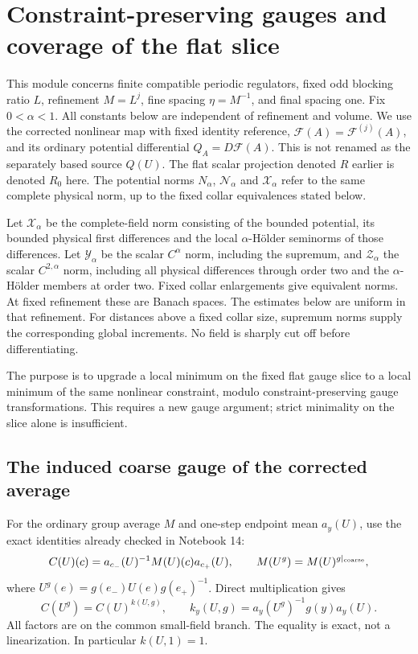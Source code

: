 \documentclass[11pt]{article}
\theoremstyle{remark}
\newcommand{\norm}[1]{\left\|#1\right\|}
\begin{document}
\section{Constraint-preserving gauges and coverage of the flat slice}
\label{ng-section}

This module concerns finite compatible periodic regulators, fixed
odd blocking ratio $L$, refinement $M=L^j$, fine spacing $\eta=M^{-1}$,
and final spacing one. Fix $0<\alpha<1$. All constants below are
independent of refinement and volume. We use the corrected nonlinear
map with fixed identity reference, $\mathcal F(A)=\mathcal F^{(j)}(A)$,
and its ordinary potential differential $Q_A=D\mathcal F(A)$.
This is not renamed as the separately based source $Q(U)$.
The flat scalar projection denoted $R$ earlier is denoted $R_0$
here. The potential norms $N_\alpha$, $\mathcal N_\alpha$ and
$\mathcal X_\alpha$ refer to the same complete physical norm,
up to the fixed collar equivalences stated below.

Let $\mathcal X_\alpha$ be the complete-field norm consisting of
the bounded potential, its bounded physical first differences and
the local $\alpha$-H\"older seminorms of those differences. Let
$\mathcal Y_\alpha$ be the scalar $C^\alpha$ norm, including the
supremum, and $\mathcal Z_\alpha$ the scalar $C^{2,\alpha}$ norm,
including all physical differences through order two and the
$\alpha$-H\"older members at order two. Fixed collar enlargements
give equivalent norms. At fixed refinement these are Banach spaces.
The estimates below are uniform in that refinement. For distances
above a fixed collar size, supremum norms supply the corresponding
global increments. No field is sharply cut off before differentiating.

The purpose is to upgrade a local minimum on the fixed flat gauge
slice to a local minimum of the same nonlinear constraint, modulo
constraint-preserving gauge transformations. This requires a new
gauge argument; strict minimality on the slice alone is insufficient.

\subsection{The induced coarse gauge of the corrected average}

For the ordinary group average $M$ and one-step endpoint mean
$a_y(U)$, use the exact identities already checked in Notebook 14:
\[
 C(U)(c)=a_{c_-}(U)^{-1}M(U)(c)a_{c_+}(U),\qquad
 M(U^g)=M(U)^{g|_{\rm coarse}},
\]
where $U^g(e)=g(e_-)U(e)g(e_+)^{-1}$. Direct multiplication gives
\begin{equation}\label{ng-induced-group-gauge}
 C(U^g)=C(U)^{k(U,g)},\qquad
 k_y(U,g)=a_y(U^g)^{-1}g(y)a_y(U).
\end{equation}
All factors are on the common small-field branch. The equality is
exact, not a linearization. In particular $k(U,1)=1$.
\end{document}
